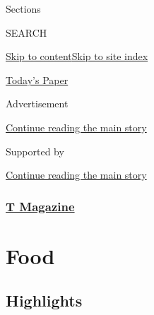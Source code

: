 Sections

SEARCH

\protect\hyperlink{site-content}{Skip to
content}\protect\hyperlink{site-index}{Skip to site index}

\href{https://myaccount.nytimes.com/auth/login?response_type=cookie\&client_id=vi}{}

\href{https://www.nytimes.com/section/todayspaper}{Today's Paper}

Advertisement

\protect\hyperlink{after-top}{Continue reading the main story}

Supported by

\protect\hyperlink{after-sponsor}{Continue reading the main story}

\hypertarget{t-magazine}{%
\subsubsection{\texorpdfstring{\href{/section/t-magazine}{T
Magazine}}{T Magazine}}\label{t-magazine}}

\hypertarget{food}{%
\section{Food}\label{food}}

\hypertarget{highlights}{%
\subsection{Highlights}\label{highlights}}

